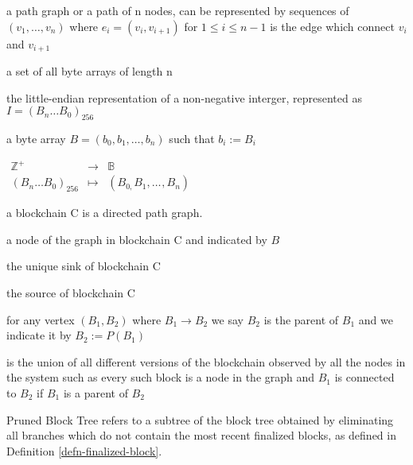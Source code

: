\documentclass{book}
\newcommand{\assign}{:=}
\newcommand{\glossaryentry}[3]{\item[{#1}\hfill]#2\dotfill#3}
\newcommand{\tmop}[1]{\ensuremath{\operatorname{#1}}}
\newcommand{\tmtextbf}[1]{{\bfseries{#1}}}
\newenvironment{theglossary}[1]{\begin{list}{}{\setlength{\labelwidth}{6.5em}\setlength{\leftmargin}{7em}\small} }{\end{list}}
\providecommand{\tmop}[1]{\ensuremath{\mathrm{#1}}}
\providecommand{\tmtextbf}[1]{\tmtextbf{#1}}
\begin{document}
\begin{theglossary}{gly}
  \glossaryentry{\tmtextbf{$P_n$}}{a path graph or a path of n nodes, can be
  represented by sequences of $(v_1, \ldots, v_n)$ where $e_i = (v_i, v_{i +
  1})$ for $1 \leqslant i \leqslant n - 1$ is the edge which connect $v_i$ and
  $v_{i + 1}$}{\pageref{autolab1}}
  
  \glossaryentry{$\mathbb{B}_n$}{a set of all byte arrays of length
  n}{\pageref{autolab2}}
  
  \glossaryentry{I}{the little-endian representation of a non-negative
  interger, represented as $I = (B_n \ldots B_0)_{256}$}{\pageref{autolab3}}
  
  \glossaryentry{$B$}{a byte array $B = (b_0, b_1, \ldots, b_n)$ such that
  $b_i \assign B_i$}{\pageref{autolab4}}
  
  \glossaryentry{$\tmop{Enc}_{\tmop{LE}}$}{$\begin{array}{lll}
    \mathbb{Z}^+ & \rightarrow & \mathbb{B}\\
    (B_n \ldots B_0)_{256} & \mapsto & (B_{0,} B_1, \ldots_{}, B_n)
  \end{array}$}{\pageref{autolab5}}
  
  \glossaryentry{C, blockchain}{a blockchain C is a directed path
  graph.}{\pageref{autolab6}}
  
  \glossaryentry{Block}{a node of the graph in blockchain C and indicated by
  $B$}{\pageref{autolab7}}
  
  \glossaryentry{Genesis Block}{the unique sink of blockchain
  C}{\pageref{autolab8}}
  
  \glossaryentry{Head}{the source of blockchain C}{\pageref{autolab9}}
  
  \glossaryentry{P}{for any vertex $(B_1, B_2)$ where $B_1 \rightarrow B_2$ we
  say $B_2$ is the parent of $B_1$ and we indicate it by $B_2 \assign P
  (B_1)$}{\pageref{autolab10}}
  
  \glossaryentry{BT, block tree}{is the union of all different versions of the
  blockchain observed by all the nodes in the system such as every such block
  is a node in the graph and $B_1$ is connected to $B_2$ if $B_1$ is a parent
  of $B_2$}{\pageref{autolab11}}
  
  \glossaryentry{PBT, Pruned BT}{Pruned Block Tree refers to a subtree of the
  block tree obtained by eliminating all branches which do not contain the
  most recent finalized blocks, as defined in Definition
  \ref{defn-finalized-block}.}{\pageref{autolab12}}
  

\end{theglossary}
\end{document}
